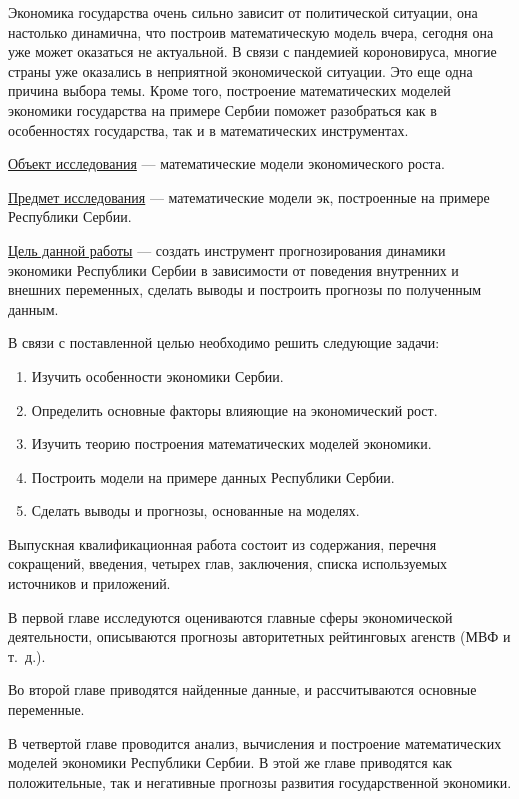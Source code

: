 Экономика государства очень сильно зависит от политической ситуации, она настолько динамична, что построив математическую модель вчера, сегодня она уже может оказаться не актуальной. В связи с пандемией короновируса, многие страны уже оказались в неприятной экономической ситуации.
Это еще одна причина выбора темы.
Кроме того, построение математических моделей экономики государства на примере Сербии поможет разобраться как в особенностях государства, так и в математических инструментах.

\underline{Объект исследования} --- математические модели экономического роста.

\underline{Предмет исследования} --- математические модели эк, построенные на примере Республики Сербии.

\underline{Цель данной работы} --- создать инструмент прогнозирования динамики экономики Республики Сербии в зависимости от поведения внутренних и внешних переменных, сделать выводы и построить прогнозы по полученным данным.

В связи с поставленной целью необходимо решить следующие задачи:
\begin{enumerate}
	\item Изучить особенности экономики Сербии.
	\item Определить основные факторы влияющие на экономический рост.
	\item Изучить теорию построения математических моделей экономики.
	\item Построить модели на примере данных Республики Сербии.
	\item Сделать выводы и прогнозы, основанные на моделях.
\end{enumerate}

Выпускная квалификационная работа состоит из содержания, перечня сокращений, введения, четырех глав, заключения, списка используемых источников и приложений.

В первой главе исследуются оцениваются главные сферы экономической деятельности, описываются прогнозы авторитетных рейтинговых агенств (МВФ и т.~д.).

Во второй главе приводятся найденные данные, и рассчитываются основные переменные.

В четвертой главе проводится анализ, вычисления и построение математических моделей экономики Республики Сербии. В этой же главе приводятся как положительные, так и негативные прогнозы развития государственной экономики.

